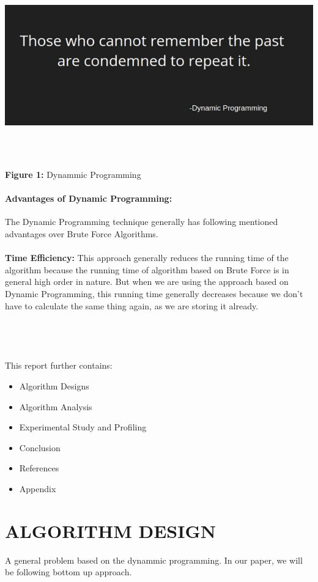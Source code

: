 \documentclass[10pt]{article}
\begin{document}
\begin{multicols*}{2}
\includegraphics[width=\columnwidth, height=8cm]{DP.png}\begin{center}\textbf{Figure 1:} Dynammic Programming\end{center}


\paragraph{Advantages of Dynamic Programming:}
The Dynamic Programming technique generally has following mentioned advantages over Brute Force Algorithms.\\\\
\textbf{Time Efficiency: } This approach generally reduces the running time of the algorithm because the running time of algorithm based on Brute Force is in general high order in nature. But when we are using the approach based on Dynamic Programming, this running time generally decreases because we don't have to calculate the same thing again, as we are storing it already. \\
\\\\\\\\This report further contains:
\begin{itemize}
\item 	Algorithm  Designs
\item 	Algorithm  Analysis
\item 	Experimental Study and Profiling
\item 	Conclusion
\item 	References
\item 	Appendix
\end{itemize}

\section*{ALGORITHM DESIGN}
A general problem based on the dynammic programming. In our paper, we will be following bottom up approach.


\end{multicols*}
\end{document}
